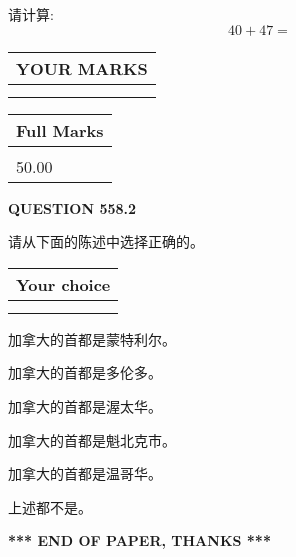 \documentclass{ctexart}
\begin{document}
  
 
请计算:
\begin{equation}
40 +  %
47 = \nonumber
\end{equation}
 

 

 
  
\vspace{0.2in}
  
\noindent\begin{tabular}{|l|}
\hline
 YOUR MARKS  \\
\hline
 \\ 
 \\ 
\hline
\end{tabular}
\hspace{0.05in} \begin{tabular}{|l|}
\hline
 Full Marks  \\
\hline
 \\ 
50.00 \\
\hline
\end{tabular}
{\textbf{\Large{QUESTION
558.2 
}}}
  
  
请从下面的陈述中选择正确的。
  
  
\noindent\hspace{3.0in} \begin{tabular}{|l|}
\hline
Your choice \\
\hline
 \\ 
 \\ 
\hline
\end{tabular}
  
  
 
 
加拿大的首都是蒙特利尔。
 
 
加拿大的首都是多伦多。
 
 
加拿大的首都是渥太华。
 
 
加拿大的首都是魁北克市。
 
 
加拿大的首都是温哥华。
 
 
 上述都不是。
 
 
   
   
 \vspace{0.2in}
 
   
   
   
   
\vspace{1.0in} 
{\textbf{\large{ *** END OF PAPER, THANKS *** }}} 
   
\end{document}
